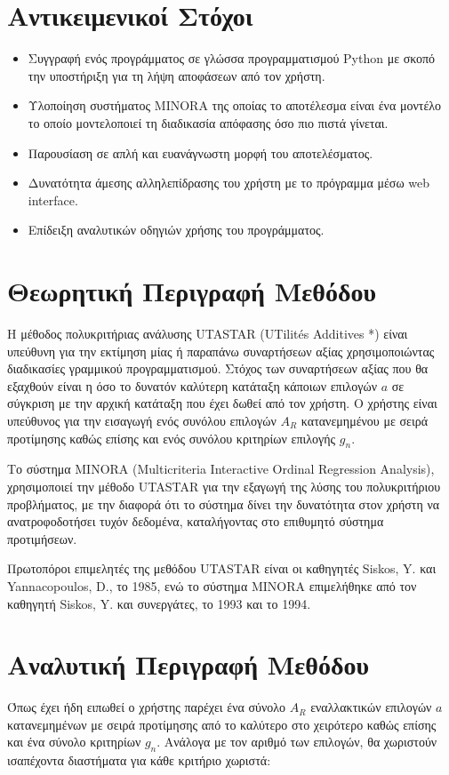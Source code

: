 \documentclass[12pt,a4paper,titlepage]{article}
\numberwithin{equation}{section}
\begin{document}
\section{Αντικειμενικοί Στόχοι}
\label{sec:1}   
\begin{itemize}
	\item Συγγραφή ενός προγράμματος σε γλώσσα προγραμματισμού Python με σκοπό την υποστήριξη για τη λήψη αποφάσεων από τον χρήστη.
	\item Υλοποίηση συστήματος MINORA της οποίας το αποτέλεσμα είναι ένα μοντέλο το οποίο μοντελοποιεί τη διαδικασία απόφασης όσο πιο πιστά γίνεται.
	\item Παρουσίαση σε απλή και ευανάγνωστη μορφή του αποτελέσματος.
	\item Δυνατότητα άμεσης αλληλεπίδρασης του χρήστη με το πρόγραμμα μέσω web interface.
	\item Επίδειξη αναλυτικών οδηγιών χρήσης του προγράμματος.
\end{itemize}


\section{Θεωρητική Περιγραφή Μεθόδου}
\label{sec:2}
Η μέθοδος πολυκριτήριας ανάλυσης UTASTAR (UTilités Additives *) είναι υπεύθυνη για την εκτίμηση μίας ή παραπάνω συναρτήσεων αξίας χρησιμοποιώντας διαδικασίες γραμμικού προγραμματισμού. Στόχος των συναρτήσεων αξίας που θα εξαχθούν είναι η όσο το δυνατόν καλύτερη κατάταξη κάποιων επιλογών $a$ σε σύγκριση με την αρχική κατάταξη που έχει δωθεί από τον χρήστη. Ο χρήστης είναι υπεύθυνος για την εισαγωγή ενός συνόλου επιλογών $A_{R}$ κατανεμημένου με σειρά προτίμησης καθώς επίσης και ενός συνόλου κριτηρίων επιλογής $g_{n}$. 

Το σύστημα MINORA (Multicriteria Interactive Ordinal Regression Analysis), χρησιμοποιεί την μέθοδο UTASTAR για την εξαγωγή της λύσης του πολυκριτήριου προβλήματος, με την διαφορά ότι το σύστημα δίνει την δυνατότητα στον χρήστη να ανατροφοδοτήσει τυχόν δεδομένα, καταλήγοντας στο επιθυμητό σύστημα προτιμήσεων.

Πρωτοπόροι επιμελητές της μεθόδου UTASTAR είναι οι καθηγητές Siskos, Y. και Yannacopoulos, D., το 1985, ενώ το σύστημα MINORA επιμελήθηκε από τον καθηγητή Siskos, Y. και συνεργάτες, το 1993 και το 1994. 

\newpage

\section{Αναλυτική Περιγραφή Μεθόδου}
\label{sec:3}
Όπως έχει ήδη ειπωθεί ο χρήστης παρέχει ένα σύνολο $A_{R}$ εναλλακτικών επιλογών $a$ κατανεμημένων με σειρά προτίμησης από το καλύτερο στο χειρότερο καθώς επίσης και ένα σύνολο κριτηρίων $g_{n}$. Ανάλογα με τον αριθμό των επιλογών, θα χωριστούν ισαπέχοντα διαστήματα για κάθε κριτήριο χωριστά: 
\end{document}
